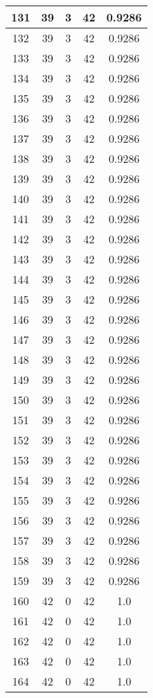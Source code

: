 \documentclass[letterpaper, 12pt]{article}
\begin{document}
\begin{longtable}{|c|c|c|c|c|}
\hline
131 & 39 & 3 & 42 & 0.9286 \\
\hline
132 & 39 & 3 & 42 & 0.9286 \\
\hline
133 & 39 & 3 & 42 & 0.9286 \\
\hline
134 & 39 & 3 & 42 & 0.9286 \\
\hline
135 & 39 & 3 & 42 & 0.9286 \\
\hline
136 & 39 & 3 & 42 & 0.9286 \\
\hline
137 & 39 & 3 & 42 & 0.9286 \\
\hline
138 & 39 & 3 & 42 & 0.9286 \\
\hline
139 & 39 & 3 & 42 & 0.9286 \\
\hline
140 & 39 & 3 & 42 & 0.9286 \\
\hline
141 & 39 & 3 & 42 & 0.9286 \\
\hline
142 & 39 & 3 & 42 & 0.9286 \\
\hline
143 & 39 & 3 & 42 & 0.9286 \\
\hline
144 & 39 & 3 & 42 & 0.9286 \\
\hline
145 & 39 & 3 & 42 & 0.9286 \\
\hline
146 & 39 & 3 & 42 & 0.9286 \\
\hline
147 & 39 & 3 & 42 & 0.9286 \\
\hline
148 & 39 & 3 & 42 & 0.9286 \\
\hline
149 & 39 & 3 & 42 & 0.9286 \\
\hline
150 & 39 & 3 & 42 & 0.9286 \\
\hline
151 & 39 & 3 & 42 & 0.9286 \\
\hline
152 & 39 & 3 & 42 & 0.9286 \\
\hline
153 & 39 & 3 & 42 & 0.9286 \\
\hline
154 & 39 & 3 & 42 & 0.9286 \\
\hline
155 & 39 & 3 & 42 & 0.9286 \\
\hline
156 & 39 & 3 & 42 & 0.9286 \\
\hline
157 & 39 & 3 & 42 & 0.9286 \\
\hline
158 & 39 & 3 & 42 & 0.9286 \\
\hline
159 & 39 & 3 & 42 & 0.9286 \\
\hline
160 & 42 & 0 & 42 & 1.0 \\
\hline
161 & 42 & 0 & 42 & 1.0 \\
\hline
162 & 42 & 0 & 42 & 1.0 \\
\hline
163 & 42 & 0 & 42 & 1.0 \\
\hline
164 & 42 & 0 & 42 & 1.0 \\

\end{longtable}
\end{document}
